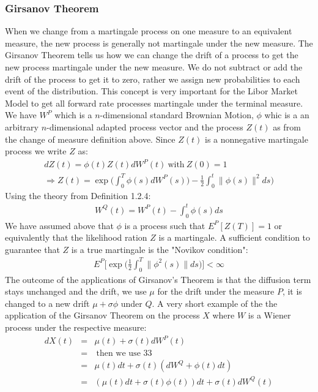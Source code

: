 \documentclass[11pt]{article}
\numberwithin{equation}{subsection}
\begin{document}
\subsubsection{Girsanov Theorem}
When we change from a martingale process on one measure to an equivalent measure, the new process is generally not martingale under the new measure. The Girsanov Theorem tells us how we can change the drift of a process to get the new process martingale under the new measure. We do not subtract or add the drift of the process to get it to zero, rather we assign new probabilities to each event of the distribution. This concept is very important for the Libor Market Model to get all forward rate processes martingale under the terminal measure.\\
We have \(W^P\) which is a \(n\)-dimensional standard Brownian Motion, \(\phi\) whic is a an arbitrary \(n\)-dimensional adapted process vector and the process \(Z(t)\) as from the change of measure definition above. Since \(Z(t)\) is a nonnegative martingale process we write \(Z\) as: 
\begin{eqnarray}
	dZ(t)  = \phi(t) Z(t) dW^P(t) \ \text{with} \ Z(0) = 1 \\
	\Rightarrow	Z(t)  = \exp\bigg(\int_{0}^{T} \phi(s)dW^P(s)) - \frac{1}{2} \int_{0}^{t} \|\phi(s)\|^2 ds\bigg)
\end{eqnarray}
Using the theory from Definition 1.2.4:
\begin{eqnarray}
W^Q(t) = W^P(t) - \int_{0}^{t} \phi(s)ds
\end{eqnarray}
We have assumed above that \(\phi\) is a process such that \(E^P[Z(T)]=1\) or equivalently that the likelihood ration \(Z\) is a martingale. A sufficient condition to guarantee that \(Z\) is a true martingale is the "Novikov condition":
\begin{eqnarray}
	E^P\bigg[\exp\bigg(\frac{1}{2} \int_{0}^{T} \|\phi^2(s)\| ds\bigg)\bigg] < \infty
\end{eqnarray}
The outcome of the applications of Girsanov's Theorem is that the diffusion term stays unchanged and the drift, we use \(\mu\) for the drift under the measure \(P\), it is changed to a new drift \(\mu + \sigma \phi\) under \(Q\). A very short example of the the application of the Girsanov Theorem on the process \(X\) where \(W\) is a Wiener process under the respective measure:
\begin{eqnarray}
	dX(t) &=& \mu(t) + \sigma(t) dW^{P}(t) \\
	 &=& \ \text{then we use 33} \\
	 &=& \mu(t) dt + \sigma(t)(dW^Q + \phi(t)dt) \\
	 &=& (\mu(t) dt + \sigma(t)\phi(t))dt + \sigma(t) dW^Q(t)
\end{eqnarray}
\end{document}
